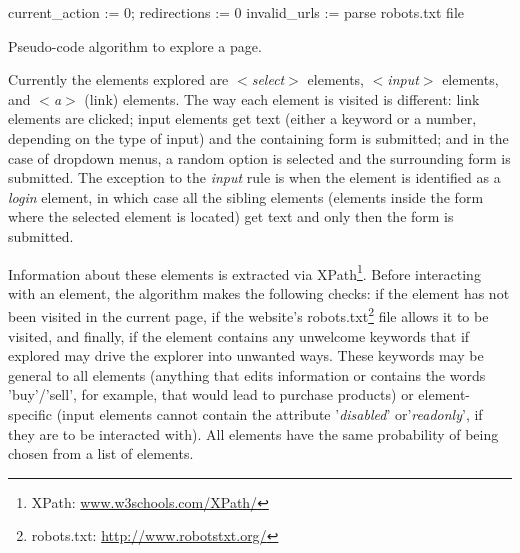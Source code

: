 \documentclass[conference]{IEEEtran}
\begin{document}
\begin{algorithm}
  
  current\_action := 0; redirections := 0\;
  invalid\_urls := parse robots.txt file\;
  

\caption{Pseudo-code algorithm to explore a page.}\label{alg:seeker}
\end{algorithm}

Currently the elements explored are \textit{$<$select$>$} elements, \textit{$<$input$>$} elements, and \textit{$<$a$>$} (link) elements. The way each element is visited is different: link elements are clicked; input elements get text (either a keyword or a number, depending on the type of input) and the containing form is submitted; and in the case of dropdown menus, a random option is selected and the surrounding form is submitted. The exception to the \textit{input} rule is when the element is identified as a \textit{login} element, in which case all the sibling elements (elements inside the form where the selected element is located) get text and only then the form is submitted.

Information about these elements is extracted via XPath\footnote{XPath: \url{www.w3schools.com/XPath/}}. Before interacting with an element, the algorithm makes the following checks: if the element has not been visited in the current page, if the website's robots.txt\footnote{robots.txt: \url{http://www.robotstxt.org/}} file allows it to be visited, and finally, if the element contains any unwelcome keywords that if explored may drive the explorer into unwanted ways. These keywords may be general to all elements (anything that edits information or contains the words 'buy'/'sell', for example, that would lead to purchase products) or element-specific (input elements cannot contain the attribute '\textit{disabled}' or'\textit{readonly}', if they are to be interacted with). All elements have the same probability of being chosen from a list of elements.
\end{document}
